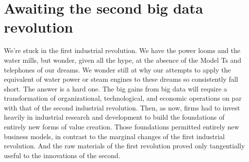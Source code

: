 \documentclass[12pt]{article}
\begin{document}





\section{Awaiting the second big data revolution}
\label{sec:awaiting-big-data}

We're stuck in the first industrial revolution. We have the power
looms and the water mills, but wonder, given all the hype, at the
absence of the Model Ts and telephones of our dreams. We wonder still
at why our attempts to apply the equivalent of water power or steam
engines to these dreams so consistently fall short. The answer is a
hard one. The big gains from big data will require a transformation of
organizational, technological, and economic operations on par with
that of the second industrial revolution. Then, as now, firms had to
invest heavily in industrial research and development to build the
foundations of entirely new forms of value creation. Those foundations
permitted entirely new business models, in contrast to the marginal
changes of the first industrial revolution. And the raw materials of
the first revolution proved only tangentially useful to the
innovations of the second.
\end{document}
